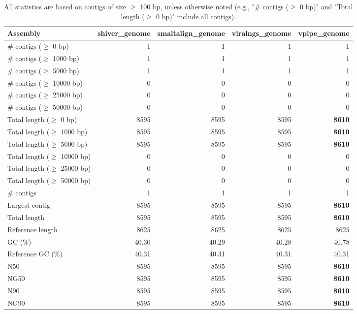 \documentclass[12pt,a4paper]{article}
\begin{document}
\begin{table}[ht]
\begin{center}
\caption{All statistics are based on contigs of size $\geq$ 100 bp, unless otherwise noted (e.g., "\# contigs ($\geq$ 0 bp)" and "Total length ($\geq$ 0 bp)" include all contigs).}
\begin{tabular}{|l*{4}{|r}|}
\hline
Assembly & shiver\_genome & smaltalign\_genome & viralngs\_genome & vpipe\_genome \\ \hline
\# contigs ($\geq$ 0 bp) & 1 & 1 & 1 & 1 \\ \hline
\# contigs ($\geq$ 1000 bp) & 1 & 1 & 1 & 1 \\ \hline
\# contigs ($\geq$ 5000 bp) & 1 & 1 & 1 & 1 \\ \hline
\# contigs ($\geq$ 10000 bp) & 0 & 0 & 0 & 0 \\ \hline
\# contigs ($\geq$ 25000 bp) & 0 & 0 & 0 & 0 \\ \hline
\# contigs ($\geq$ 50000 bp) & 0 & 0 & 0 & 0 \\ \hline
Total length ($\geq$ 0 bp) & 8595 & 8595 & 8595 & {\bf 8610} \\ \hline
Total length ($\geq$ 1000 bp) & 8595 & 8595 & 8595 & {\bf 8610} \\ \hline
Total length ($\geq$ 5000 bp) & 8595 & 8595 & 8595 & {\bf 8610} \\ \hline
Total length ($\geq$ 10000 bp) & 0 & 0 & 0 & 0 \\ \hline
Total length ($\geq$ 25000 bp) & 0 & 0 & 0 & 0 \\ \hline
Total length ($\geq$ 50000 bp) & 0 & 0 & 0 & 0 \\ \hline
\# contigs & 1 & 1 & 1 & 1 \\ \hline
Largest contig & 8595 & 8595 & 8595 & {\bf 8610} \\ \hline
Total length & 8595 & 8595 & 8595 & {\bf 8610} \\ \hline
Reference length & 8625 & 8625 & 8625 & 8625 \\ \hline
GC (\%) & 40.30 & 40.29 & 40.28 & 40.78 \\ \hline
Reference GC (\%) & 40.31 & 40.31 & 40.31 & 40.31 \\ \hline
N50 & 8595 & 8595 & 8595 & {\bf 8610} \\ \hline
NG50 & 8595 & 8595 & 8595 & {\bf 8610} \\ \hline
N90 & 8595 & 8595 & 8595 & {\bf 8610} \\ \hline
NG90 & 8595 & 8595 & 8595 & {\bf 8610} \\ \hline

\end{tabular}
\end{center}
\end{table}
\end{document}
